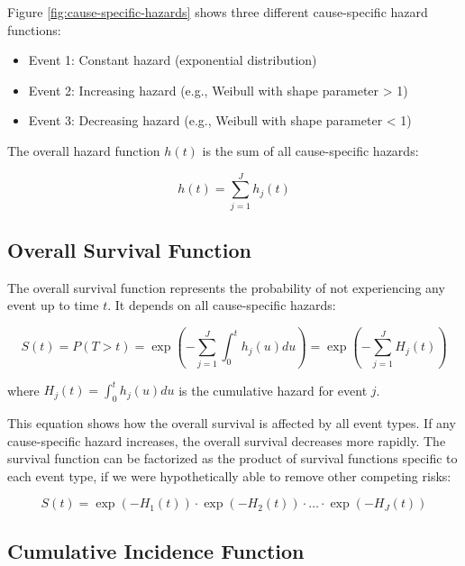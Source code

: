 Figure \ref{fig:cause-specific-hazards} shows three different cause-specific hazard functions:
\begin{itemize}
    \item Event 1: Constant hazard (exponential distribution)
    \item Event 2: Increasing hazard (e.g., Weibull with shape parameter > 1)
    \item Event 3: Decreasing hazard (e.g., Weibull with shape parameter < 1)
\end{itemize}

The overall hazard function $h(t)$ is the sum of all cause-specific hazards:

\begin{equationbox}
\begin{equation}
h(t) = \sum_{j=1}^{J} h_j(t)
\end{equation}
\end{equationbox}

\subsection{Overall Survival Function}

The overall survival function represents the probability of not experiencing any event up to time $t$. It depends on all cause-specific hazards:

\begin{equationbox}[title=Overall Survival Function]
\begin{equation}
S(t) = P(T > t) = \exp\left(-\sum_{j=1}^{J} \int_0^t h_j(u) du\right) = \exp\left(-\sum_{j=1}^{J} H_j(t)\right)
\end{equation}

where $H_j(t) = \int_0^t h_j(u) du$ is the cumulative hazard for event $j$.
\end{equationbox}

This equation shows how the overall survival is affected by all event types. If any cause-specific hazard increases, the overall survival decreases more rapidly. The survival function can be factorized as the product of survival functions specific to each event type, if we were hypothetically able to remove other competing risks:

\begin{equation}
S(t) = \exp(-H_1(t)) \cdot \exp(-H_2(t)) \cdot \ldots \cdot \exp(-H_J(t))
\end{equation}

\subsection{Cumulative Incidence Function}

